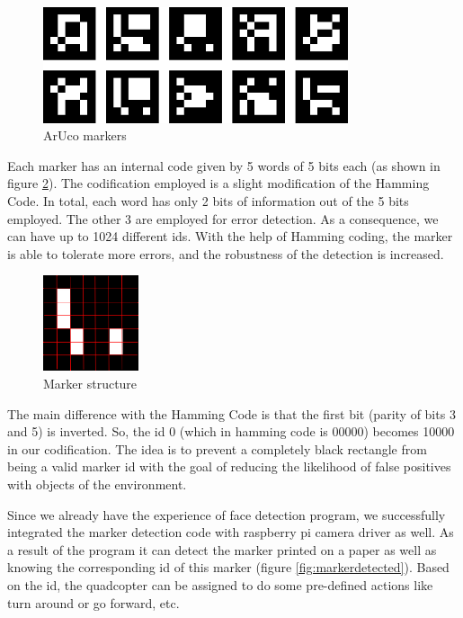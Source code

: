 \documentclass[11pt, a4paper, onecolumn, oneside, parskip=half]{scrartcl}
\begin{document}
\begin{figure}[ht]
\centering
\includegraphics[width=0.8\textwidth]{image00}
\caption{ArUco markers}
\label{fig:markers}
\end{figure}

Each marker has an internal code given by 5 words of 5 bits each (as shown in figure \ref{fig:markerstructure}). The codification employed is a slight modification of the Hamming Code. In total, each word has only 2 bits of information out of the 5 bits employed. The other 3 are employed for error detection. As a consequence, we can have up to 1024 different ids. With the help of Hamming coding, the marker is able to tolerate more errors, and the robustness of the detection is increased.

\begin{figure}[ht]
\centering
\includegraphics[width=0.25\textwidth]{image04}
\caption{Marker structure}
\label{fig:markerstructure}
\end{figure}

The main difference with the Hamming Code is that the first bit (parity of bits 3 and 5) is inverted. So, the id 0 (which in hamming code is 00000) becomes 10000 in our codification. The idea is to prevent a completely black rectangle from being a valid marker id with the goal of reducing the likelihood of false positives with objects of the environment.

Since we already have the experience of face detection program, we successfully integrated the marker detection code with raspberry pi camera driver as well. As a result of the program it can detect the marker printed on a paper as well as knowing the corresponding id of this marker (figure \ref{fig:markerdetected}). Based on the id, the quadcopter can be assigned to do some pre-defined actions like turn around or go forward, etc.
\end{document}
